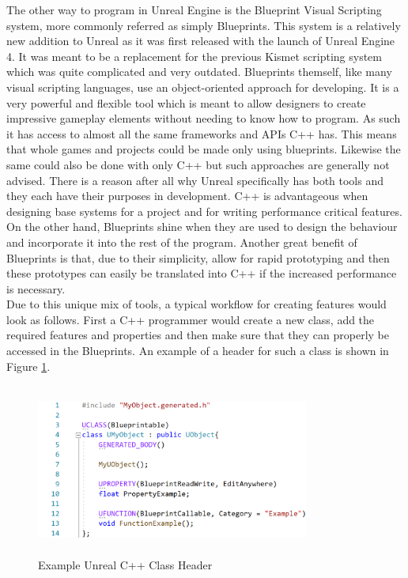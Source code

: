 The other way to program in Unreal Engine is the Blueprint Visual Scripting system, more commonly referred as simply Blueprints. This system is a relatively new addition to Unreal as it was first released with the launch of Unreal Engine 4. It was meant to be a replacement for the previous Kismet scripting system which was quite complicated and very outdated. Blueprints themself, like many visual scripting languages, use an object-oriented approach for developing. It is a very powerful and flexible tool which is meant to allow designers to create impressive gameplay elements without needing to know how to program. As such it has access to almost all the same frameworks and APIs C++ has. This means that whole games and projects could be made only using blueprints. Likewise the same could also be done with only C++ but such approaches are generally not advised. There is a reason after all why Unreal specifically has both tools and they each have their purposes in development. C++ is advantageous when designing base systems for a project and for writing performance critical features. On the other hand, Blueprints shine when they are used to design the behaviour and incorporate it into the rest of the program. Another great benefit of Blueprints is that, due to their simplicity, allow for rapid prototyping and then these prototypes can easily be translated into C++ if the increased performance is necessary.\\
Due to this unique mix of tools, a typical workflow for creating features would look as follows. First a C++ programmer would create a new class, add the required features and properties and then make sure that they can properly be accessed in the Blueprints. An example of a header for such a class is shown in Figure \ref{fig:ClassExample}.
\begin{figure}[htpb]
	\centering
	\includegraphics[width=0.8\textwidth,height=160pt]{fig/ClassExample3.png}
	\caption[Example Unreal C++ Class Header]{Example Unreal C++ Class Header\protect}
	\label{fig:ClassExample}
\end{figure}

